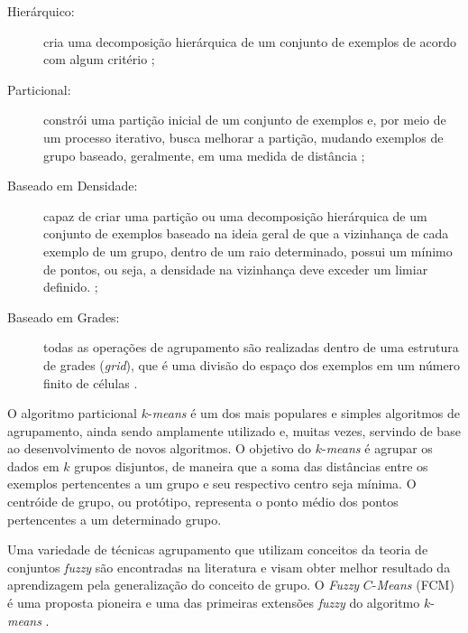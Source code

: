 \begin{description}
   \item[Hierárquico:] cria uma decomposição hierárquica de um conjunto de exemplos de acordo com algum critério \cite{Day1984, Kaufman1990, zhang1996};
   \item[Particional:] constrói uma partição inicial de um conjunto de exemplos e, por meio de um processo iterativo, busca melhorar a partição, mudando exemplos de grupo baseado, geralmente, em uma medida de distância \cite{macqueen1967, Bezdek1981, Kaufman1990};
   \item[Baseado em Densidade:] %
   capaz de criar uma partição ou uma decomposição hierárquica de um conjunto de exemplos baseado na ideia geral de que a vizinhança de cada exemplo de um grupo, dentro de um raio determinado, possui um mínimo de pontos, ou seja, a densidade na vizinhança deve exceder um limiar definido. %
   \cite{Ester1996, Hinneburg1998, Ankerst1999};
   \item[Baseado em Grades:] todas as operações de agrupamento são realizadas dentro de uma estrutura de grades (\emph{grid}), que é uma divisão do espaço dos exemplos em um número finito de células \cite{Wang1997, Sheikholeslami2000}.
\end{description}


O algoritmo particional $k$-\emph{means} é um dos mais populares e simples algoritmos de agrupamento, ainda sendo amplamente utilizado e, muitas vezes, servindo de base ao desenvolvimento de novos algoritmos. O objetivo do $k$-\emph{means} é agrupar os dados em $k$ grupos disjuntos, de maneira que a soma das distâncias entre os exemplos pertencentes a um grupo e seu respectivo centro seja mínima. O centróide de grupo, ou protótipo, representa o ponto médio dos pontos pertencentes a um determinado grupo.

Uma variedade de técnicas agrupamento que utilizam conceitos da teoria de conjuntos \emph{fuzzy} são encontradas na literatura e visam obter melhor resultado da aprendizagem pela generalização do conceito de grupo. O \emph{Fuzzy} $C$-\emph{Means} (FCM) \cite{Bezdek1981} é uma proposta pioneira e uma das primeiras extensões \emph{fuzzy} do algoritmo $k$-\emph{means} \cite{macqueen1967}.

